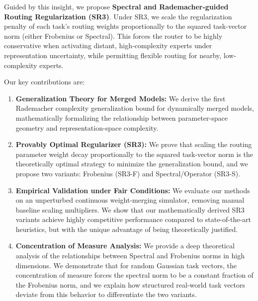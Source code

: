 Guided by this insight, we propose \textbf{Spectral and Rademacher-guided Routing Regularization (SR3)}. Under SR3, we scale the regularization penalty of each task's routing weights proportionally to the squared task-vector norm (either Frobenius or Spectral). This forces the router to be highly conservative when activating distant, high-complexity experts under representation uncertainty, while permitting flexible routing for nearby, low-complexity experts.

Our key contributions are:
\begin{enumerate}
    \item \textbf{Generalization Theory for Merged Models:} We derive the first Rademacher complexity generalization bound for dynamically merged models, mathematically formalizing the relationship between parameter-space geometry and representation-space complexity.
    \item \textbf{Provably Optimal Regularizer (SR3):} We prove that scaling the routing parameter weight decay proportionally to the squared task-vector norm is the theoretically optimal strategy to minimize the generalization bound, and we propose two variants: Frobenius (SR3-F) and Spectral/Operator (SR3-S).
    \item \textbf{Empirical Validation under Fair Conditions:} We evaluate our methods on an unperturbed continuous weight-merging simulator, removing manual baseline scaling multipliers. We show that our mathematically derived SR3 variants achieve highly competitive performance compared to state-of-the-art heuristics, but with the unique advantage of being theoretically justified.
    \item \textbf{Concentration of Measure Analysis:} We provide a deep theoretical analysis of the relationships between Spectral and Frobenius norms in high dimensions. We demonstrate that for random Gaussian task vectors, the concentration of measure forces the spectral norm to be a constant fraction of the Frobenius norm, and we explain how structured real-world task vectors deviate from this behavior to differentiate the two variants.
\end{enumerate}